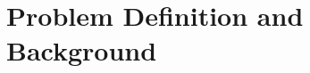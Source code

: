 \documentclass[letterpaper]{article}
\begin{document}



\section{Problem Definition and Background}




\end{document}
